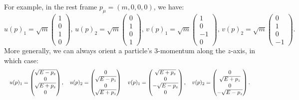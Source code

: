 For example, in the rest frame $p_\mu = (m, 0, 0, 0)$, we have:
\begin{equation}
	\label{eq:01_qft_spinors_dirac_solution_rest}
	u(p)_1 = \sqrt{m} \begin{pmatrix} 1 \\ 0 \\ 1 \\ 0 \end{pmatrix}, \,
	u(p)_2 = \sqrt{m} \begin{pmatrix} 0 \\ 1 \\ 0 \\ 1 \end{pmatrix}, \,
	v(p)_1 = \sqrt{m} \begin{pmatrix} 1 \\ 0 \\ -1 \\ 0 \end{pmatrix}, \,
	v(p)_2 = \sqrt{m} \begin{pmatrix} 0 \\ 1 \\ 0 \\ -1 \end{pmatrix}.
\end{equation}
More generally, we can always orient a particle's 3-momentum along the $z$-axis, in which case:
\begin{equation}
	\label{eq:01_qft_spinors_dirac_solution_momentum}
\resizebox{\textwidth}{!}{$
	u(p)_1 = \begin{pmatrix} \sqrt{E - p_z} \\ 0 \\ \sqrt{E + p_z} \\ 0 \end{pmatrix}, \quad
	u(p)_2 = \begin{pmatrix} 0 \\ \sqrt{E - p_z} \\ 0 \\ \sqrt{E + p_z} \end{pmatrix} \quad
	v(p)_1 = \begin{pmatrix} \sqrt{E + p_z} \\ 0 \\ -\sqrt{E - p_z} \\ 0 \end{pmatrix}, \quad
	v(p)_2 = \begin{pmatrix} 0 \\ \sqrt{E + p_z} \\ 0 \\ -\sqrt{E - p_z} \end{pmatrix}.
$}
\end{equation}

